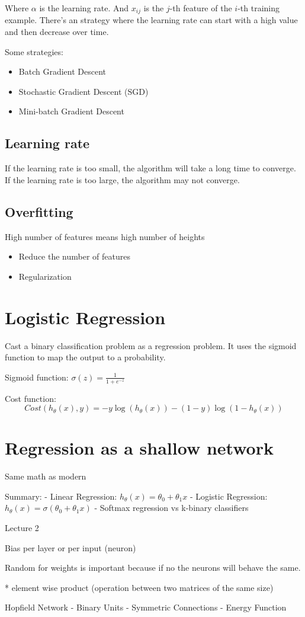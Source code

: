 \documentclass{article}
\begin{document}
Where $\alpha$ is the learning rate.
And $x_{ij}$ is the $j$-th feature of the $i$-th training example.
There's an strategy where the learning rate can start with a high 
value and then decrease over time.

Some strategies:
\begin{itemize}
    \item Batch Gradient Descent
    \item Stochastic Gradient Descent (SGD)
    \item Mini-batch Gradient Descent
\end{itemize}

\subsection{Learning rate}

If the learning rate is too small, the algorithm will take a long time to converge.
If the learning rate is too large, the algorithm may not converge.

\subsection{Overfitting}

High number of features means high number of heights
\begin{itemize}
    \item Reduce the number of features
    \item Regularization
\end{itemize}

\section{Logistic Regression}

Cast a binary classification problem as a regression problem. It uses the sigmoid function to map the output to a probability.

Sigmoid function: $\sigma(z) = \frac{1}{1 + e^{-z}}$

Cost function: 
$$
Cost(h_\theta(x), y) = -y \log(h_\theta(x)) - (1 - y) \log(1 - h_\theta(x))
$$


\section{Regression as a shallow network}
Same math as modern

Summary: 
- Linear Regression: $h_\theta(x) = \theta_0 + \theta_1 x$
- Logistic Regression: $h_\theta(x) = \sigma(\theta_0 + \theta_1 x)$
- Softmax regression vs k-binary classifiers



Lecture 2

Bias per layer or per input (neuron)

Random for weights is important because if no the neurons will behave the same.

* element wise product (operation between two matrices of the same size)

Hopfield Network
- Binary Units
- Symmetric Connections
- Energy Function
\end{document}
